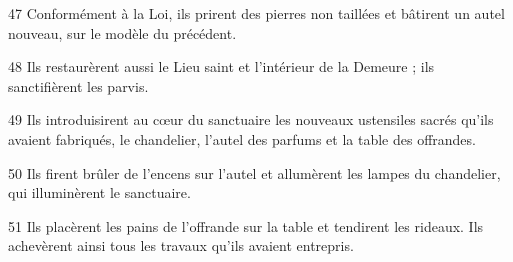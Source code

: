 
47 Conformément à la Loi, ils prirent des pierres non taillées et bâtirent un autel nouveau, sur le modèle du précédent.

48 Ils restaurèrent aussi le Lieu saint et l’intérieur de la Demeure ; ils sanctifièrent les parvis.

49 Ils introduisirent au cœur du sanctuaire les nouveaux ustensiles sacrés qu’ils avaient fabriqués, le chandelier, l’autel des parfums et la table des offrandes.

50 Ils firent brûler de l’encens sur l’autel et allumèrent les lampes du chandelier, qui illuminèrent le sanctuaire.

51 Ils placèrent les pains de l’offrande sur la table et tendirent les rideaux. Ils achevèrent ainsi tous les travaux qu’ils avaient entrepris.